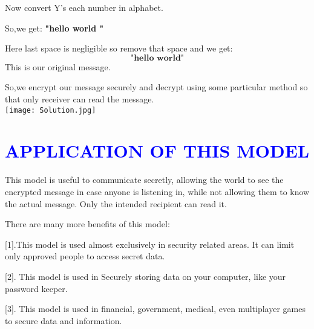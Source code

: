 \documentclass[12pt]{article}
\begin{document}
    Now convert Y's each number in alphabet.
    
    So,we get:
    \textbf{"hello world "}
    
    Here last space is negligible so remove that space and we get:
    $$\textbf{"hello world"}$$
    This is our original message.
    
    So,we encrypt our message securely and decrypt using some particular method so that only receiver can read the message.\\
    
    \texttt{[image: Solution.jpg]}

\section{\textcolor{blue}{ APPLICATION OF THIS MODEL \cite{2} }}
\textsf
	This model is useful to communicate secretly, allowing the world to see the encrypted message in case anyone is listening in, while not allowing them to know the actual message. Only the intended recipient can read it. 

	
	There are many more benefits of this model:
	
	
	[1].This model is used almost exclusively in security related areas. It can limit only approved people to access secret data.

	[2]. This model is used in  Securely storing data on your computer, like your password keeper.
	
	[3]. This model is used in financial, government, medical, even multiplayer games to secure data and information.

\printbibliography
 
\end{document}
